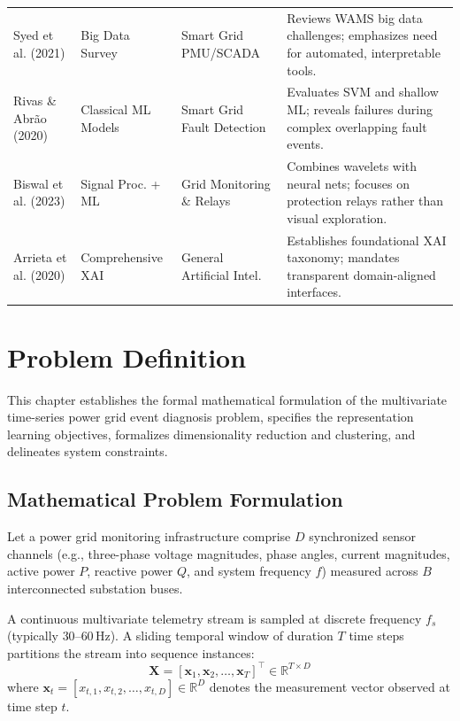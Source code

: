 \documentclass[12pt,a4paper]{report}
\begin{document}
\begin{singlespace}
\begin{xltabular}{\textwidth}{>{\raggedright\arraybackslash}p{2.6cm} >{\raggedright\arraybackslash}p{2.6cm} >{\raggedright\arraybackslash}p{2.6cm} >{\raggedright\arraybackslash}X}
Syed et al. (2021) \cite{ref_syed2021_smartgrid} & Big Data Survey & Smart Grid PMU/SCADA & Reviews WAMS big data challenges; emphasizes need for automated, interpretable tools. \\ \addlinespace[3pt]
Rivas \& Abr\~{a}o (2020) \cite{ref_rivas2020_faults} & Classical ML Models & Smart Grid Fault Detection & Evaluates SVM and shallow ML; reveals failures during complex overlapping fault events. \\ \addlinespace[3pt]
Biswal et al. (2023) \cite{ref_biswal2023_realtime} & Signal Proc. + ML & Grid Monitoring \& Relays & Combines wavelets with neural nets; focuses on protection relays rather than visual exploration. \\ \addlinespace[3pt]
Arrieta et al. (2020) \cite{ref_arrieta2020_xai} & Comprehensive XAI & General Artificial Intel. & Establishes foundational XAI taxonomy; mandates transparent domain-aligned interfaces. \\
\end{xltabular}
\end{singlespace}


\chapter{Problem Definition}

This chapter establishes the formal mathematical formulation of the multivariate time-series power grid event diagnosis problem, specifies the representation learning objectives, formalizes dimensionality reduction and clustering, and delineates system constraints.

\section{Mathematical Problem Formulation}
Let a power grid monitoring infrastructure comprise $D$ synchronized sensor channels (e.g., three-phase voltage magnitudes, phase angles, current magnitudes, active power $P$, reactive power $Q$, and system frequency $f$) measured across $B$ interconnected substation buses. 

A continuous multivariate telemetry stream is sampled at discrete frequency $f_s$ (typically $30\text{--}60$\,Hz). A sliding temporal window of duration $T$ time steps partitions the stream into sequence instances:
\begin{equation}
    \mathbf{X} = [\mathbf{x}_1, \mathbf{x}_2, \dots, \mathbf{x}_T]^\top \in \mathbb{R}^{T \times D}
\end{equation}
where $\mathbf{x}_t = [x_{t, 1}, x_{t, 2}, \dots, x_{t, D}] \in \mathbb{R}^D$ denotes the measurement vector observed at time step $t$.
\end{document}
